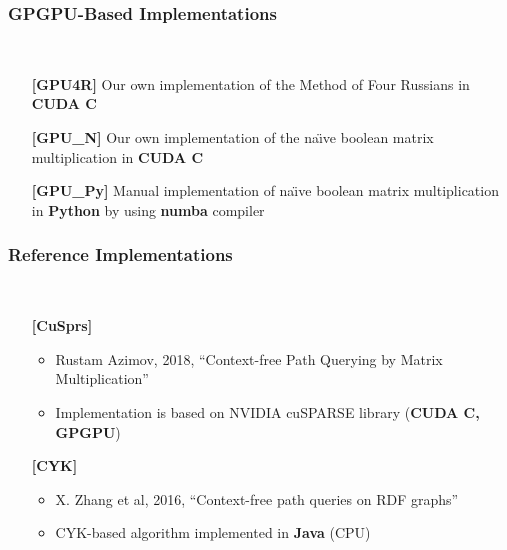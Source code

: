 \documentclass[xcolor=table]{beamer}
\begin{document}
\begin{frame}[fragile] \frametitle{GPGPU-Based Implementations}
  \begin{minipage}[t]{1cm}
\hspace{1cm}
  \end{minipage}
  ~
\begin{minipage}[t]{0.85\textwidth}
\begin{itemize}
\item[\textbf{[GPU4R]}] Our own implementation of the Method of Four
Russians in \textbf{CUDA C}
\pause
\item[\textbf{[GPU\_N]}] Our own implementation of the na\"{\i}ve boolean
matrix multiplication in \textbf{CUDA C}
\pause
\item[\textbf{[GPU\_Py]}] Manual implementation of na\"{\i}ve boolean matrix
multiplication in \textbf{Python} by using \textbf{numba} compiler
\end{itemize}
\end{minipage}
\end{frame}

\begin{frame}[fragile] \frametitle{Reference Implementations}
  \begin{minipage}[t]{1cm}
\hspace{1cm}
  \end{minipage}
  ~
\begin{minipage}[t]{0.85\textwidth}
\begin{itemize}
\item[\textbf{[CuSprs]}]
\begin{itemize}
  \item Rustam Azimov, 2018, ``Context-free Path Querying by Matrix Multiplication''
  \item Implementation is based on NVIDIA cuSPARSE library (\textbf{CUDA C, GPGPU})
\end{itemize}
\pause
\item[\textbf{[CYK]}]
\begin{itemize}
  \item X. Zhang et al, 2016, ``Context-free path queries on RDF graphs''
  \item CYK-based algorithm implemented in \textbf{Java} (CPU)
\end{itemize}
\end{itemize}
\end{minipage}
\end{frame}
\end{document}
